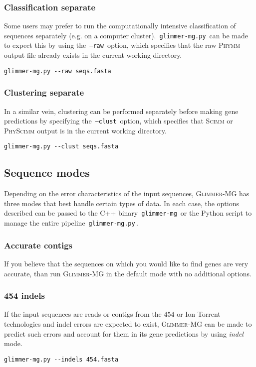 \documentclass[fleqn,titlepage,11pt]{article}
\def\Gmg{\textsc{Glimmer-MG}}
\def\Phymm{\textsc{Phymm}}
\def\Scimm{\textsc{Scimm}}
\def\PhyScimm{\textsc{PhyScimm}}
\def\Pg#1{\texttt{#1}}
\begin{document}
\subsubsection{Classification separate}
Some users may prefer to run the computationally intensive
classification of sequences separately (e.g. on a computer cluster).
\,\Pg{glimmer-mg.py}\, can be made to expect this by using the
\,\Pg{--raw}\, option, which specifies that the raw \Phymm{} output file
already exists in the current working directory.
\BSV
\begin{verbatim}
glimmer-mg.py --raw seqs.fasta
\end{verbatim}
\ESV

\subsubsection{Clustering separate}
In a similar vein, clustering can be performed separately before
making gene predictions by specifying the \,\Pg{--clust}\, option,
which specifies that \Scimm{} or \PhyScimm{} output is in the current
working directory.
\BSV
\begin{verbatim}
glimmer-mg.py --clust seqs.fasta
\end{verbatim}
\ESV

\subsection{Sequence modes}
Depending on the error characteristics of the input sequences, \Gmg{}
has three modes that best handle certain types of data. In each case,
the options described can be passed to the C++ binary
\,\Pg{glimmer-mg}\, or the Python script to manage the entire pipeline
\,\Pg{glimmer-mg.py}\,.

\subsubsection{Accurate contigs}
If you believe that the sequences on which you would like to find
genes are very accurate, than run \Gmg{} in the default mode with no
additional options.

\subsubsection{454 indels}
If the input sequences are reads or contigs from the 454 or Ion
Torrent technologies and indel errors are expected to exist, \Gmg{}
can be made to predict such errors and account for them in its gene
predictions by using \emph{indel} mode.
\BSV
\begin{verbatim}
glimmer-mg.py --indels 454.fasta
\end{verbatim}
\ESV
\end{document}
